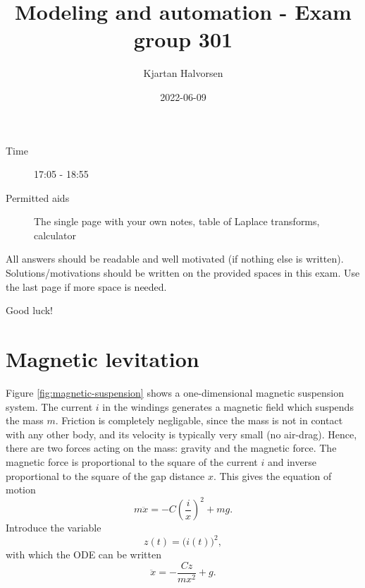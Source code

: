 \documentclass[letterpaper,12pt]{scrartcl}
\title{Modeling and automation - Exam group 301}
\author{Kjartan Halvorsen}
\date{2022-06-09}
\newcommand{\bmpl}{\begin{minipage}[t]{\textwidth}}
\newcommand{\emp}{\end{minipage}}
\begin{document}
\maketitle


\begin{description}
\item[Time] 17:05 - 18:55
\item[Permitted aids] The single page with your own notes, table of Laplace transforms, calculator
\end{description}

All answers should be readable and well motivated (if nothing else is written). Solutions/motivations should be written on the provided spaces in this exam. Use the last page if more space is needed.

\begin{center}
{\Large Good luck!} \\
\end{center}

\noindent
\fbox{
\bmpl
\textbf{ Matricula and name:}\\
\vspace*{14mm}
\emp}




\section*{Magnetic levitation}
\label{sec-1}

Figure \ref{fig:magnetic-suspension} shows a one-dimensional magnetic suspension system. The current $i$ in the windings generates a magnetic field which suspends the mass $m$. Friction is completely negligable, since the mass is not in contact with any other body, and its velocity is typically very small (no air-drag). Hence, there are two forces acting on the mass: gravity and the magnetic force. The magnetic force is proportional to the square of the current $i$ and inverse proportional to the square of the gap distance $x$. This gives the equation of motion 
\begin{equation}
m \ddot{x} = -C \left( \frac{i}{x} \right)^2 + mg.
\label{eq:magode}
\end{equation}
Introduce the variable
\[ z(t) = \big(i(t)\big)^2,\]
with which the ODE can be written
\begin{equation}
\ddot{x} = -\frac{Cz}{mx^2} + g.
\label{eq:magodenew}
\end{equation}
\end{document}
